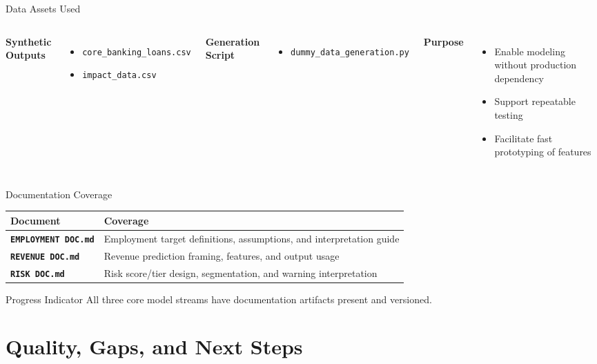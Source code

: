 \documentclass[10pt]{beamer}
\begin{document}
\begin{frame}{Data Assets Used}
\begin{columns}[T]
\textbf{Synthetic Outputs}
\begin{itemize}
    \item \texttt{core\_banking\_loans.csv}
    \item \texttt{impact\_data.csv}
\end{itemize}

\textbf{Generation Script}
\begin{itemize}
    \item \texttt{dummy\_data\_generation.py}
\end{itemize}

\textbf{Purpose}
\begin{itemize}
    \item Enable modeling without production dependency
    \item Support repeatable testing
    \item Facilitate fast prototyping of features
\end{itemize}
\end{columns}
\end{frame}

\begin{frame}{Documentation Coverage}
\small
\begin{tabularx}{\textwidth}{>{\bfseries}l X}
\toprule
Document & Coverage \\
\midrule
\texttt{EMPLOYMENT DOC.md} & Employment target definitions, assumptions, and interpretation guide \\
\texttt{REVENUE DOC.md} & Revenue prediction framing, features, and output usage \\
\texttt{RISK DOC.md} & Risk score/tier design, segmentation, and warning interpretation \\
\bottomrule
\end{tabularx}

\vspace{0.5em}
\begin{block}{Progress Indicator}
All three core model streams have documentation artifacts present and versioned.
\end{block}
\end{frame}

\section{Quality, Gaps, and Next Steps}
\end{document}
